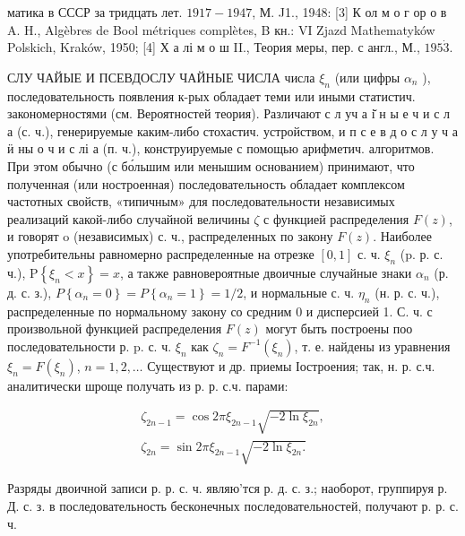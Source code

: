 \documentclass[10pt]{article}
\begin{document}
матика в СССР за тридцать лет. $1917-1947$, М. J1., 1948: [3] К ол м о г ор о в A. H., Algèbres de Bool métriques complètes, B кн.: VI Zjazd Mathematyków Polskich, Kraków, 1950; [4] Х а лі м о ш II., Теория меры, пер. с англ., М., $195 \dot{3}$.



СЛУ ЧАЙЫЕ И ПСЕВДОСЛУ ЧАЙНЫЕ ЧИСЛА числа $\xi_{n}$ (или цифры $\alpha_{n}$ ), последовательность появления к-рых обладает теми или иными статистич. закономерностями (см. Вероятностей теория). Различают с л уч а і̆ н ы е ч и с л а (с. ч.), генерируемые каким-либо стохастич. устройством, и п с е в д о с л у ч а ӥ ны о ч и с лі а (п. ч.), конструируемые с помощью арифметич. алгоритмов. При этом обычно (с бо́льшим или менышим основанием) принимают, что полученная (или ностроенная) последовательность обладает комплексом частотных свойств, «типичным» для последовательности независимых реализаций какой-либо случайной величины $\zeta$ с функцией распределения $F(z)$, и говорят o (независимых) с. ч., распределенных по закону $F(z)$. Наиболее употребительны равномерно распределенные на отрезке $[0,1]$ с. ч. $\xi_{n}$ (p. р. с. ч.), $\mathrm{P}\left\{\xi_{n}<x\right\}=x$, а также равновероятные двоичные случайные знаки $\alpha_{n}$ (р. д. с. з.), $P\left\{\alpha_{n}=0\right\}=P\left\{\alpha_{n}=1\right\}=1 / 2$, и нормальные с. ч. $\eta_{n}$ (н. р. с. ч.), распределенные по нормальному закону со средним 0 и дисперсией 1. С. ч. с произвольной функцией распределения $F(z)$ могут быть построены поо последовательности р. p. с. ч. $\xi_{n}$ как $\zeta_{n}=F^{-1}\left(\xi_{n}\right)$, т. е. найдены из уравнения $\xi_{n}=F\left(\xi_{n}\right)$, $n=1,2, \ldots$ Существуют и др. приемы Іостроения; так, н. р. с.ч. аналитически шроще получать из р. р. с.ч. парами:



\[

\begin{gathered}

\zeta_{2 n-1}=\cos 2 \pi \xi_{2 n-1} \sqrt{-2 \ln \xi_{2 n}}, \\

\zeta_{2 n}=\sin 2 \pi \xi_{2 n-1} \sqrt{-2 \ln \xi_{2 n} .}

\end{gathered}

\]



Разряды двоичной записи р. р. с. ч. являю'тся р. д. с. з.; наоборот, группируя р. Д. с. з. в последовательность бесконечных последовательностей, получают р. р. с. ч.
\end{document}
